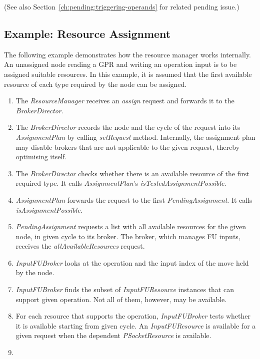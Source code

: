 \documentclass[a4paper,twoside]{tce}
\begin{document}
(See also Section~\ref{ch:pending:triggering-operands} for related pending
issue.)

\subsection{Example: Resource Assignment}
\label{ssec:assignment-algorithm}

The following example demonstrates how the resource manager works
internally. An unassigned node reading a GPR and writing an operation input
is to be assigned suitable resources. In this example, it is assumed that
the first available resource of each type required by the node can be
assigned.

\begin{enumerate}
\item %
  The \emph{ResourceManager} receives an \emph{assign} request and forwards
  it to the \emph{BrokerDirector}.
\item %
  The \emph{BrokerDirector} records the node and the cycle of the request
  into its \emph{AssignmentPlan} by calling \emph{setRequest} method.
  Internally, the assignment plan may disable brokers that are not
  applicable to the given request, thereby optimising itself.
\item %
  The \emph{BrokerDirector} checks whether there is an available resource
  of the first required type. It calls \emph{AssignmentPlan}'s
  \emph{isTestedAssignmentPossible}.
\item %
  \emph{AssignmentPlan} forwards the request to the first
  \emph{PendingAssignment}. It calls \emph{isAssignmentPossible}.
\item %
  \emph{PendingAssignment} requests a list with all available resources for
  the given node, in given cycle to its broker. The broker, which manages FU
  inputs, receives the \emph{allAvailableResources} request.
\item %
  \emph{InputFUBroker} looks at the operation and the input index of the
  move held by the node.
\item %
  \emph{InputFUBroker} finds the subset of \emph{InputFUResource} instances
  that can support given operation. Not all of them, however, may be
  available.
\item %
  For each resource that supports the operation, \emph{InputFUBroker} tests
  whether it is available starting from given cycle. An
  \emph{InputFUResource} is available for a given request when the dependent
  \emph{PSocketResource} is available.
\item %

\end{enumerate}
\end{document}
